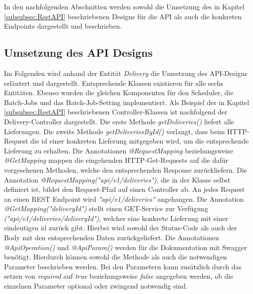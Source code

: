 In den nachfolgenden Abschnitten werden sowohl die Umsetzung des in Kapitel \ref{subsubsec:RestAPI} beschriebenen Designs für die API als auch die konkreten Endpoints dargestellt und beschrieben.

\subsection{Umsetzung des API Designs}
Im Folgenden wird anhand der Entität \textit{Delivery} die Umsetzung des API-Designs erläutert und dargestellt. Entsprechende Klassen existieren für alle sechs Entitäten. Ebenso wurden die gleichen Komponenten für den Scheduler, die Batch-Jobs und das Batch-Job-Setting implementiert.
Als Beispiel der in Kapitel \ref{subsubsec:RestAPI} beschriebenen Controller-Klassen ist nachfolgend der Delivery-Controller dargestellt. Die erste Methode \textit{getDeliveries()} liefert alle Lieferungen. Die zweite Methode \textit{getDeliveriesById()} verlangt, dass beim HTTP-Request die id einer konkreten Lieferung mitgegeben wird, um die entsprechende Lieferung zu erhalten. Die Annotationen \textit{@RequestMapping} beziehungsweise \textit{@GetMapping} mappen die eingehenden HTTP-Get-Requests auf die dafür vorgesehenen Methoden, welche den entsprechenden Response zurückliefern. Die Annotation \textit{@RequestMapping("\/api/v1/deliveries")}, die in der Klasse selbst definiert ist, bildet den Request-Pfad auf einen Controller ab. An jedes Request an einen REST Endpoint wird \textit{"\/api/v1/deliveries"} angehangen. Die Annotation \textit{@GetMapping("\/{deliveryId}")} stellt einen GET-Service zur Verfügung  \textit{("\/api/v1/deliveries/{deliveryId}")}, welcher eine konkrete Lieferung mit einer eindeutigen id zurück gibt. Hierbei wird sowohl der Status-Code als auch der Body mit den entsprechenden Daten zurückgeliefert. Die Annotationen \textit{@ApiOperation()} und \textit{@ApiParam()} werden für die Dokumentation mit Swagger benötigt. Hierdurch können sowohl die Methode als auch die notwendigen Parameter beschrieben werden. Bei den Parametern kann zusätzlich durch das setzen von \textit{required} auf \textit{true} beziehungsweise \textit{false} angegeben werden, ob die einzelnen Parameter optional oder zwingend notwendig sind. \newpage

